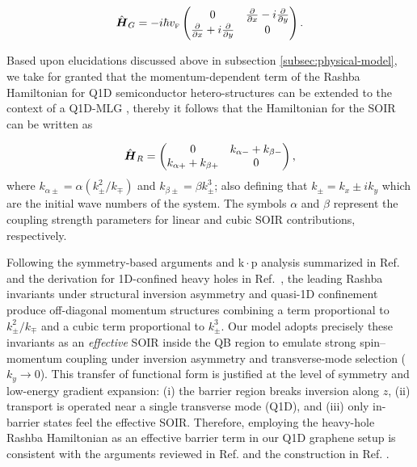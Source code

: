 \begin{equation}
    \label{eq:pristineGrapheneMatrix}
    \hat{\mbox{\boldmath $H$}}_G = -i\hbar v_{\mbox{\tiny F}}
    \begin{pmatrix}
        0                                                         & \frac{\partial}{\partial x}- i\frac{\partial}{\partial y} \\
        \frac{\partial}{\partial x}+ i\frac{\partial}{\partial y} & 0
    \end{pmatrix}.
\end{equation}

Based upon elucidations discussed above in subsection \ref{subsec:physical-model}, we take for granted that the momentum-dependent term of the Rashba Hamiltonian for Q1D semiconductor hetero-structures can be extended to the context of a Q1D-MLG \cite{RDiago2010, Serna2019, RCDiagoEPL2015}, thereby it follows that the Hamiltonian for the SOIR can be written as

\begin{equation}
    \label{eq:SOIRHamiltonian}
    \hat{\mbox{\boldmath $H$}}_R =
    \begin{pmatrix}
        0 & k_{\alpha-} + k_{\beta-} \\
        k_{\alpha+} + k_{\beta+} & 0
    \end{pmatrix},
\end{equation}
\noindent where $k_{\alpha\pm} = \alpha\left(k_{\pm}^2/k_{\mp}\right)$ and $k_{\beta\pm} = \beta k_{\pm}^3$; also defining that $k_{\pm}=k_x\pm i k_y$ which are the initial wave numbers of the system.
The symbols $\alpha$ and $\beta$ represent the coupling strength parameters for linear and cubic SOIR contributions, respectively.

Following the symmetry-based arguments and k\,$\cdot$\,p analysis summarized in Ref.~\cite{Serna2019} and the derivation for 1D-confined heavy holes in Ref.~\cite{RCDiagoEPL2015}, the leading Rashba invariants under structural inversion asymmetry and quasi-1D confinement produce off-diagonal momentum structures combining a term proportional to $k_{\pm}^2/k_{\mp}$ and a cubic term proportional to $k_{\pm}^3$. Our model adopts precisely these invariants as an \emph{effective} SOIR inside the QB region to emulate strong spin--momentum coupling under inversion asymmetry and transverse-mode selection ($k_y\!\to\!0$).
This transfer of functional form is justified at the level of symmetry and low-energy gradient expansion: (i) the barrier region breaks inversion along $z$, (ii) transport is operated near a single transverse mode (Q1D), and (iii) only in-barrier states feel the effective SOIR\@. Therefore, employing the heavy-hole Rashba Hamiltonian as an effective barrier term in our Q1D graphene setup is consistent with the arguments reviewed in Ref. \cite{Serna2019} and the construction in Ref. \cite{RCDiagoEPL2015}.

